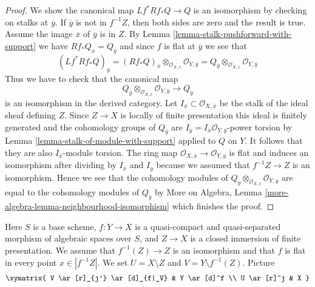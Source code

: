 \begin{proof}
We show the canonical map $Lf^*Rf_*Q \to Q$ is an isomorphism
by checking on stalks at $\overline{y}$. If $\overline{y}$ is not
in $f^{-1}Z$, then both sides are zero and the result is true.
Assume the image $\overline{x}$ of $\overline{y}$ is in $Z$.
By Lemma \ref{lemma-stalk-pushforward-with-support} we have
$Rf_*Q_{\overline{x}} = Q_{\overline{y}}$ and since $f$ is flat
at $\overline{y}$ we see that
$$
(Lf^*Rf_*Q)_{\overline{y}} =
(Rf_*Q)_{\overline{x}}
\otimes_{\mathcal{O}_{X, \overline{x}}}
\mathcal{O}_{Y, \overline{y}} =
Q_{\overline{y}} \otimes_{\mathcal{O}_{X, \overline{x}}}
\mathcal{O}_{Y, \overline{y}}
$$
Thus we have to check that the canonical map
$$
Q_{\overline{y}} \otimes_{\mathcal{O}_{X, \overline{x}}}
\mathcal{O}_{Y, \overline{y}}
\longrightarrow Q_{\overline{y}}
$$
is an isomorphism in the derived category. Let
$I_{\overline{x}} \subset \mathcal{O}_{X, \overline{x}}$ be the
stalk of the ideal sheaf defining $Z$. Since $Z \to X$ is locally of
finite presentation this ideal is finitely generated and the
cohomology groups of $Q_{\overline{y}}$
are $I_{\overline{y}} = I_{\overline{x}}\mathcal{O}_{Y, \overline{y}}$-power
torsion by Lemma \ref{lemma-stalk-of-module-with-support} applied to $Q$ on $Y$.
It follows that they are also $I_{\overline{x}}$-module torsion.
The ring map
$\mathcal{O}_{X, \overline{x}} \to \mathcal{O}_{Y, \overline{y}}$
is flat and induces an isomorphism after dividing by
$I_{\overline{x}}$ and $I_{\overline{y}}$ because we assumed
that $f^{-1}Z \to Z$ is an isomorphism. Hence we see that
the cohomology modules of
$Q_{\overline{y}} \otimes_{\mathcal{O}_{X, \overline{x}}}
\mathcal{O}_{Y, \overline{y}}$
are equal to the cohomology modules of $Q_{\overline{y}}$ by
More on Algebra, Lemma \ref{more-algebra-lemma-neighbourhood-isomorphism}
which finishes the proof.
\end{proof}



\begin{situation}
\label{situation-formal-glueing}
Here $S$ is a base scheme, $f : Y \to X$ is a quasi-compact
and quasi-separated morphism of algebraic spaces over $S$, and
$Z \to X$ is a closed immersion of finite presentation. We assume that
$f^{-1}(Z) \to Z$ is an isomorphism and that $f$ is flat in every
point $x \in |f^{-1}Z|$. We set $U = X \setminus Z$ and
$V = Y \setminus f^{-1}(Z)$.
Picture
$$
\xymatrix{
V \ar[r]_{j'} \ar[d]_{f|_V} & Y \ar[d]^f \\
U \ar[r]^j & X
}
$$
\end{situation}

